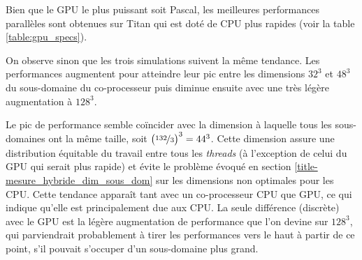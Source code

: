 Bien que le \acs{GPU} le plus puissant soit Pascal, les meilleures performances parallèles sont obtenues sur Titan qui est doté de \acs{CPU} plus rapides (voir la table \ref{table:gpu_specs}).

On observe sinon que les trois simulations suivent la même tendance. Les performances augmentent pour atteindre leur pic entre les dimensions $32^3$ et $48^3$ du sous-domaine du co-processeur puis diminue ensuite avec une très légère augmentation à $128^3$.

Le pic de performance semble coïncider avec la dimension à laquelle tous les sous-domaines ont la même taille, soit $\big(\nicefrac{132}{3}\big)^3 = 44^3$. Cette dimension assure une distribution équitable du travail entre tous les \textit{threads} (à l'exception de celui du \acs{GPU} qui serait plus rapide) et évite le problème évoqué en section \ref{title-mesure_hybride_dim_sous_dom} sur  les dimensions non optimales pour les \acs{CPU}. Cette tendance apparaît tant avec un co-processeur \acs{CPU} que \acs{GPU}, ce qui indique qu'elle est principalement due aux \acs{CPU}. La seule différence (discrète) avec le \acs{GPU} est la légère augmentation de performance que l'on devine sur $128^3$, qui parviendrait probablement à tirer les performances vers le haut à partir de ce point, s'il pouvait s'occuper d'un sous-domaine plus grand.
  
